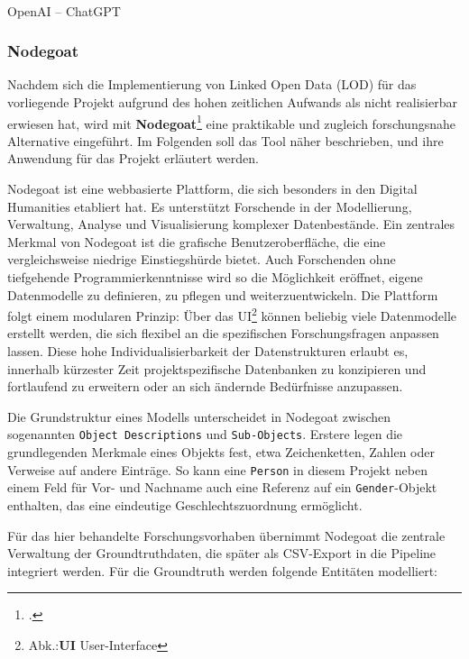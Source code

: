 \documentclass[12pt, a4paper, ngerman, bidi=default]{article}
\makeatletter
\let\cite\footcite
\newcommand{\code}[1]{\colorbox{VeryLightGray}{\texttt{#1}}} %
\let\oldparagraph\paragraph%
\renewcommand{\paragraph}{
    \@ifstar%
      \xxxParagraphStar%
      \xxxParagraphNoStar%
 }
\newcommand{\xxxParagraphStar}[1]{\oldparagraph*{#1}\mbox{}}
\newcommand{\xxxParagraphNoStar}[1]{\oldparagraph{#1}\mbox{}}
\makeatother
\begin{document}
\paragraph{OpenAI – ChatGPT}


\subsubsection{Nodegoat}\label{subsec:Nodegoat_chapter}

Nachdem sich die Implementierung von Linked Open Data (LOD) für das vorliegende Projekt aufgrund des hohen zeitlichen 
Aufwands als nicht realisierbar erwiesen hat, wird mit \textbf{Nodegoat}\cite{kessels_nodegoat_2013}
eine praktikable und zugleich forschungsnahe Alternative eingeführt. Im Folgenden soll das Tool näher beschrieben, und ihre Anwendung für das Projekt erläutert werden.

Nodegoat ist eine webbasierte Plattform, die sich besonders in den Digital Humanities etabliert hat. Es unterstützt Forschende in der Modellierung, 
Verwaltung, Analyse und Visualisierung komplexer Datenbestände. Ein zentrales Merkmal von Nodegoat ist die grafische Benutzeroberfläche, die eine vergleichsweise niedrige Einstiegshürde bietet. 
Auch Forschenden ohne tiefgehende Programmierkenntnisse wird so die Möglichkeit  eröffnet, eigene Datenmodelle zu definieren, zu pflegen und weiterzuentwickeln. 
Die Plattform folgt einem modularen Prinzip: Über das UI\footnote{Abk.:\textbf{UI} User-Interface} können beliebig viele Datenmodelle 
erstellt werden, die sich flexibel an die spezifischen Forschungsfragen anpassen lassen. Diese hohe Individualisierbarkeit der Datenstrukturen erlaubt es, innerhalb kürzester Zeit projektspezifische 
Datenbanken zu konzipieren und fortlaufend zu erweitern oder an sich ändernde Bedürfnisse anzupassen.

Die Grundstruktur eines Modells unterscheidet in Nodegoat zwischen sogenannten \code{Object Descriptions} und \code{Sub-Objects}. 
Erstere legen die grundlegenden Merkmale eines Objekts fest, etwa Zeichenketten, Zahlen oder Verweise auf andere Einträge. 
So kann eine \code{Person} in diesem Projekt neben einem Feld für Vor- und Nachname auch eine Referenz auf ein \code{Gender}-Objekt enthalten, 
das eine eindeutige Geschlechtszuordnung ermöglicht.

Für das hier behandelte Forschungsvorhaben übernimmt Nodegoat die zentrale Verwaltung der Groundtruthdaten, die später als CSV-Export in die Pipeline integriert werden. 
Für die Groundtruth werden folgende Entitäten modelliert:
\end{document}

